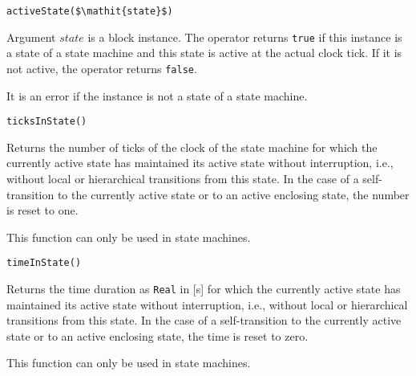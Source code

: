\begin{operatordefinition}[activeState]
\begin{synopsis}\begin{lstlisting}
activeState($\mathit{state}$)
\end{lstlisting}\end{synopsis}
\begin{semantics}
Argument $\mathit{state}$ is a block instance.
The operator returns \lstinline!true! if this instance is a state of a state machine and this state is active at the actual clock tick.
If it is not active, the operator returns \lstinline!false!.

It is an error if the instance is not a state of a state machine.
\end{semantics}
\end{operatordefinition}

\begin{operatordefinition}[ticksInState]
\begin{synopsis}\begin{lstlisting}
ticksInState()
\end{lstlisting}\end{synopsis}
\begin{semantics}
Returns the number of ticks of the clock of the state machine for which the currently active state has maintained its active state without interruption, i.e., without local or hierarchical transitions from this state.
In the case of a self-transition to the currently active state or to an active enclosing state, the number is reset to one.

This function can only be used in state machines.
\end{semantics}
\end{operatordefinition}

\begin{operatordefinition}[timeInState]
\begin{synopsis}\begin{lstlisting}
timeInState()
\end{lstlisting}\end{synopsis}
\begin{semantics}
Returns the time duration as \lstinline!Real! in {[}s{]} for which the currently active state has maintained its active state without interruption, i.e., without local or hierarchical transitions from this state.
In the case of a self-transition to the currently active state or to an active enclosing state, the time is reset to zero.

This function can only be used in state machines.
\end{semantics}
\end{operatordefinition}

